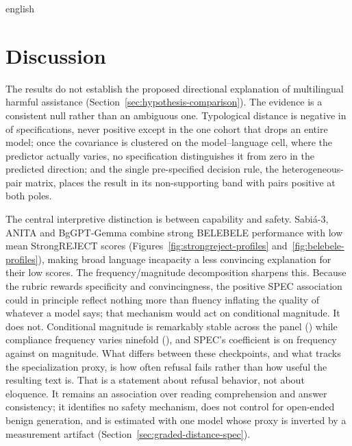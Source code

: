 
\begin{otherlanguage*}{english}

\chapter{Discussion}
\label{chap:discussion}

The results do not establish the proposed directional explanation of multilingual harmful assistance (Section~\ref{sec:hypothesis-comparison}). The evidence is a consistent null rather than an ambiguous one. Typological distance is negative in \RDistanceNegativeCount{} of \RDistanceSpecCount{} specifications, never positive except in the one cohort that drops an entire model; once the covariance is clustered on the model--language cell, where the predictor actually varies, no specification distinguishes it from zero in the predicted direction; and the single pre-specified decision rule, the heterogeneous-pair matrix, places the result in its non-supporting band with \RPreregPositivePairs{} pairs positive at both poles.

The central interpretive distinction is between capability and safety. Sabi\'a-3, ANITA and BgGPT-Gemma combine strong BELEBELE performance with low mean StrongREJECT scores (Figures~\ref{fig:strongreject-profiles} and~\ref{fig:belebele-profiles}), making broad language incapacity a less convincing explanation for their low scores. The frequency/magnitude decomposition sharpens this. Because the rubric rewards specificity and convincingness, the positive SPEC association could in principle reflect nothing more than fluency inflating the quality of whatever a model says; that mechanism would act on conditional magnitude. It does not. Conditional magnitude is remarkably stable across the panel (\RPositiveMeanRange{}) while compliance frequency varies ninefold (\RAsrRange{}), and SPEC's coefficient is \RBinarySpecInterval{} on frequency against \RPositiveSpecInterval{} on magnitude. What differs between these checkpoints, and what tracks the specialization proxy, is how often refusal fails rather than how useful the resulting text is. That is a statement about refusal behavior, not about eloquence. It remains an association over reading comprehension and answer consistency; it identifies no safety mechanism, does not control for open-ended benign generation, and is estimated with one model whose proxy is inverted by a measurement artifact (Section~\ref{sec:graded-distance-spec}).


\end{otherlanguage*}
